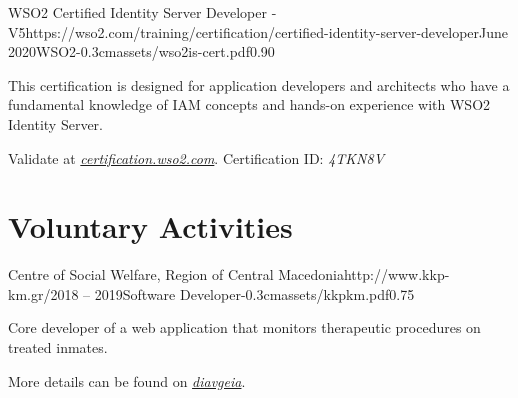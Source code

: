 \documentclass{mycv}
\begin{document}
	\vspace{0.75cm}

	\begin{EntryDatedLogo}{WSO2 Certified Identity Server Developer - V5}{https://wso2.com/training/certification/certified-identity-server-developer}{June 2020}{WSO2}{-0.3cm}{assets/wso2is-cert.pdf}{0.90}
		\vspace{-0.2cm}
		\begin{Itemize}
			\item This certification is designed for application developers and architects who have a fundamental knowledge of IAM concepts and hands-on experience with WSO2 Identity Server. 
			\item Validate at \href{https://certification.wso2.com}{\textit{certification.wso2.com}}. Certification ID: \textit{4TKN8V}
		\end{Itemize}
	\end{EntryDatedLogo}

	\section{Voluntary Activities}
	\begin{EntryDatedLogo}{Centre of Social Welfare, Region of Central Macedonia}{http://www.kkp-km.gr/}{2018 -- 2019}{Software Developer}{-0.3cm}{assets/kkpkm.pdf}{0.75}
		\vspace{-0.2cm}
		\begin{Itemize}
			\item Core developer of a web application that monitors therapeutic procedures on treated inmates.
			\item More details can be found on \href{https://diavgeia.gov.gr/decision/view/\%CE\%A8\%CE\%A6\%CE\%A1\%CE\%93\%CE\%9F\%CE\%9E\%CE\%A7\%CE\%A3-\%CE\%A0\%CE\%93\%CE\%A6}{\textit{diavgeia}}.
		\end{Itemize}
	\end{EntryDatedLogo}
\end{document}
